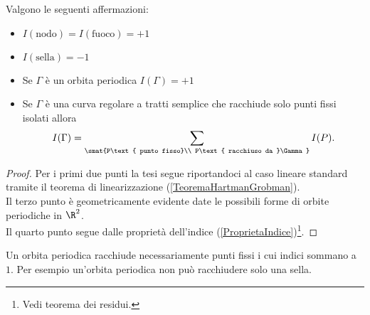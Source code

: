 \begin{proposition}\label{IndiciDiAlcuniPuntiFissi}
Valgono le seguenti affermazioni:
\begin{itemize}
\item $I(\text{nodo})=I(\text{fuoco})=+1$
\item $I(\text{sella})=-1$
\item Se $\Gamma$ \`e un orbita periodica $I(\Gamma)=+1$
\item Se $\Gamma$ \`e una curva regolare a tratti semplice che racchiude solo punti fissi isolati allora 
\[I(\Gamma)=\sum_{\smat{P\text{ punto fisso}\\ P\text{ racchiuso da }\Gamma}}I(P).\]
\end{itemize}
\end{proposition}
\begin{proof}
Per i primi due punti la tesi segue riportandoci al caso lineare standard tramite il teorema di linearizzazione (\ref{TeoremaHartmanGrobman}).\\
Il terzo punto \`e geometricamente evidente date le possibili forme di orbite periodiche in $\R^2$.\\
Il quarto punto segue dalle propriet\`a dell'indice (\ref{ProprietaIndice})\footnote{Vedi teorema dei residui.}.
\end{proof}

\begin{remark}
Un orbita periodica racchiude necessariamente punti fissi i cui indici sommano a $1$. Per esempio un'orbita periodica non pu\`o racchiudere solo una sella.
\end{remark}


